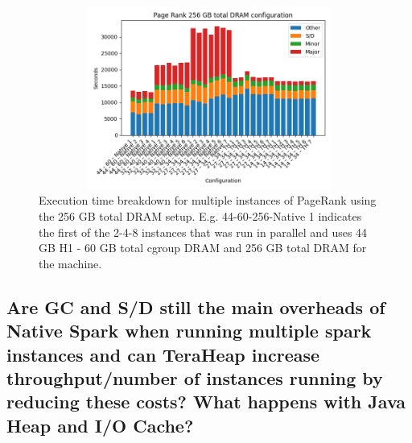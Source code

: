 \begin{figure}[ht!]
        \includegraphics[width=13cm,height=6cm]{./fig/pr256.png}
    \caption{Execution time breakdown for multiple instances of
    PageRank using the 256 GB total DRAM setup. E.g. 44-60-256-Native
    1 indicates the first of the 2-4-8 instances that was run in
    parallel and uses 44 GB H1 - 60 GB total cgroup DRAM and 256 GB
    total DRAM for the machine.}
	\label{fig:pr256}
\end{figure}

\subsection{Are GC and S/D still the main overheads of Native Spark
when running multiple spark instances and can TeraHeap increase
throughput/number of instances running by reducing these costs? What
happens with Java Heap and I/O Cache?}

